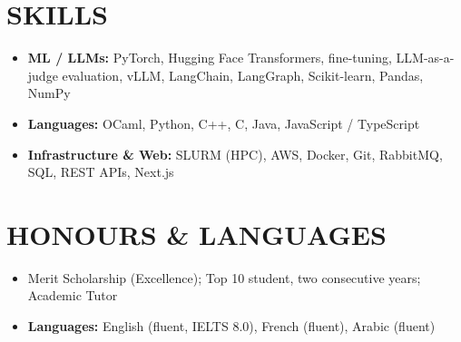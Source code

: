 \documentclass[10pt, a4paper]{article}
\begin{document}
\section*{SKILLS}
\begin{itemize}
    \item \textbf{ML / LLMs:} PyTorch, Hugging Face Transformers, fine-tuning, LLM-as-a-judge evaluation, vLLM, LangChain, LangGraph, Scikit-learn, Pandas, NumPy
    \item \textbf{Languages:} OCaml, Python, C++, C, Java, JavaScript / TypeScript
    \item \textbf{Infrastructure \& Web:} SLURM (HPC), AWS, Docker, Git, RabbitMQ, SQL, REST APIs, Next.js
\end{itemize}

\section*{HONOURS \& LANGUAGES}
\begin{itemize}
    \item Merit Scholarship (Excellence); Top 10 student, two consecutive years; Academic Tutor
    \item \textbf{Languages:} English (fluent, IELTS 8.0), French (fluent), Arabic (fluent)
\end{itemize}
\end{document}
